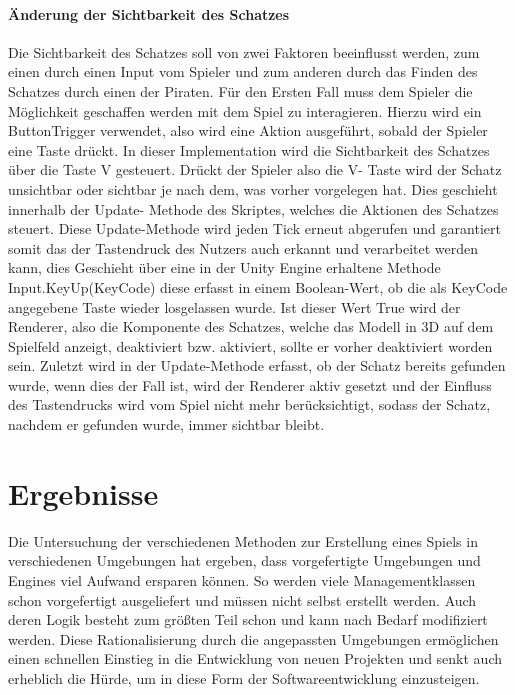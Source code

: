 \documentclass[
	12pt, %
	a4paper,
	listof=totoc, %
	bibliography=totoc, %
	numbers=noenddot, %
	ngerman, %
	headsepline, %
	oneside %
	]{scrbook} %
\begin{document}
\subsubsection{Änderung der Sichtbarkeit des Schatzes}
Die Sichtbarkeit des Schatzes soll von zwei Faktoren beeinflusst werden, zum einen durch einen Input vom Spieler und zum anderen durch das Finden des Schatzes durch einen der Piraten. Für den Ersten Fall muss dem Spieler die Möglichkeit geschaffen werden mit dem Spiel zu interagieren. Hierzu wird ein ButtonTrigger verwendet, also wird eine Aktion ausgeführt, sobald der Spieler eine Taste drückt. In dieser Implementation wird die Sichtbarkeit des Schatzes über die Taste V gesteuert. Drückt der Spieler also die V- Taste wird der Schatz unsichtbar oder sichtbar je nach dem, was vorher vorgelegen hat. Dies geschieht innerhalb der Update- Methode des Skriptes, welches die Aktionen des Schatzes steuert. Diese Update-Methode wird jeden Tick erneut abgerufen und garantiert somit das der Tastendruck des Nutzers auch erkannt und verarbeitet werden kann, dies Geschieht über eine in der Unity Engine erhaltene Methode Input.KeyUp(KeyCode) diese erfasst in einem Boolean-Wert, ob die als KeyCode angegebene Taste wieder losgelassen wurde. Ist dieser Wert True wird der Renderer, also die Komponente des Schatzes, welche das Modell in 3D auf dem Spielfeld anzeigt, deaktiviert bzw. aktiviert, sollte er vorher deaktiviert worden sein. Zuletzt wird in der Update-Methode erfasst, ob der Schatz bereits gefunden wurde, wenn dies der Fall ist, wird der Renderer aktiv gesetzt und der Einfluss des Tastendrucks wird vom Spiel nicht mehr berücksichtigt, sodass der Schatz, nachdem er gefunden wurde, immer sichtbar bleibt.


\chapter{Ergebnisse}
Die Untersuchung der verschiedenen Methoden zur Erstellung eines Spiels in verschiedenen Umgebungen hat ergeben, dass vorgefertigte Umgebungen und Engines viel Aufwand ersparen können. So werden viele Managementklassen schon vorgefertigt ausgeliefert und müssen nicht selbst erstellt werden. Auch deren Logik besteht zum größten Teil schon und kann nach Bedarf modifiziert werden.  
Diese Rationalisierung durch die angepassten Umgebungen ermöglichen einen schnellen Einstieg in die Entwicklung von neuen Projekten und senkt auch erheblich die Hürde, um in diese Form der Softwareentwicklung einzusteigen.
\end{document}
